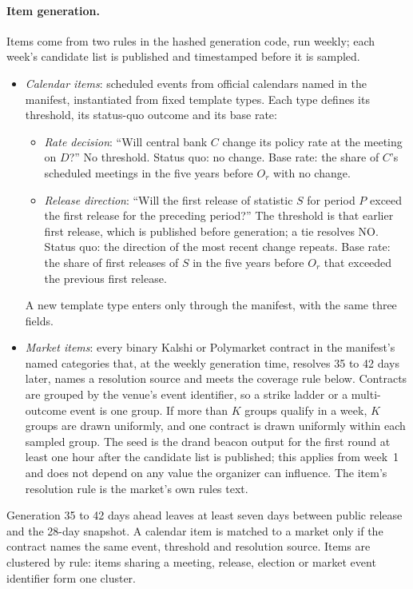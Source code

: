 \documentclass[11pt]{article}
\begin{document}
\paragraph{Item generation.} Items come from two rules in the hashed generation code, run weekly; each week's candidate list is published and timestamped before it is sampled.
\begin{itemize}
  \item \emph{Calendar items}: scheduled events from official calendars named in the manifest, instantiated from fixed template types. Each type defines its threshold, its status-quo outcome and its base rate:
  \begin{itemize}
    \item \emph{Rate decision}: ``Will central bank $C$ change its policy rate at the meeting on $D$?'' No threshold. Status quo: no change. Base rate: the share of $C$'s scheduled meetings in the five years before $O_r$ with no change.
    \item \emph{Release direction}: ``Will the first release of statistic $S$ for period $P$ exceed the first release for the preceding period?'' The threshold is that earlier first release, which is published before generation; a tie resolves NO. Status quo: the direction of the most recent change repeats. Base rate: the share of first releases of $S$ in the five years before $O_r$ that exceeded the previous first release.
  \end{itemize}
  A new template type enters only through the manifest, with the same three fields.
  \item \emph{Market items}: every binary Kalshi or Polymarket contract in the manifest's named categories that, at the weekly generation time, resolves 35 to 42 days later, names a resolution source and meets the coverage rule below. Contracts are grouped by the venue's event identifier, so a strike ladder or a multi-outcome event is one group. If more than $K$ groups qualify in a week, $K$ groups are drawn uniformly, and one contract is drawn uniformly within each sampled group. The seed is the drand beacon output \citep{drand} for the first round at least one hour after the candidate list is published; this applies from week~1 and does not depend on any value the organizer can influence. The item's resolution rule is the market's own rules text.
\end{itemize}
Generation 35 to 42 days ahead leaves at least seven days between public release and the 28-day snapshot. A calendar item is matched to a market only if the contract names the same event, threshold and resolution source. Items are clustered by rule: items sharing a meeting, release, election or market event identifier form one cluster.
\end{document}
